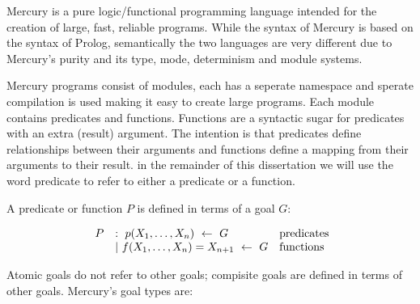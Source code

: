 

Mercury is a pure logic/functional programming language
intended for the creation of large, fast, reliable programs.
While the syntax of Mercury is based on the syntax of Prolog,
semantically the two languages are very different
due to Mercury's purity and its type, mode, determinism and module systems.

Mercury programs consist of modules,
each has a seperate namespace and sperate compilation is used making it easy
to create large programs.
Each module contains predicates and functions.
Functions are a syntactic sugar for predicates with an extra (result)
argument.
The intention is that
predicates define relationships between their arguments and
functions define a mapping from their arguments to their result.
in the remainder of this dissertation we will use the word predicate to refer to
either a predicate or a function.

A predicate or function $P$ is defined in terms of a goal $G$:

$$
\begin{array}{lll}
~P
    & :~ p(X_1, \ldots, X_n)~\leftarrow~G
        & \hbox{predicates} \\
    & |~ f(X_1, \ldots, X_n)=X_{n+1}~\leftarrow~G
        & \hbox{functions} \\
\end{array}
$$


\noindent
Atomic goals do not refer to other goals;
compisite goals are defined in terms of other goals.
Mercury's goal types are:

